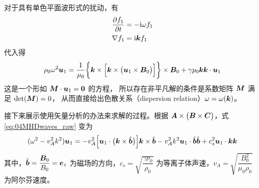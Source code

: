 对于具有单色平面波形式的扰动，有
\begin{subequations}\begin{align}
\frac{\partial {f_1}}{\partial {t}} &= - \mathrm{i} \omega f_1 \\
\nabla {f_1} &= \mathrm{i} \bm{k} f_1
\end{align}\end{subequations}
代入得
\begin{equation} \label{eq:04MHDwaves_raw}
\rho_0 \omega^2 \bm{u}_1
= \frac{1}{\mu_0} \bigg\{ \bm{k} \times \Big[ \bm{k} \times \big( \bm{u}_1 \times \bm{B}_0 \big) \Big] \bigg\} \times \bm{B}_0
+ \gamma p_0 \bm{k} \bm{k} \cdot \bm{u}_1
\end{equation}
这是一个形如 $ \bm{M} \cdot \bm{u}_1 = \bm{0} $ 的方程，
所以存在非平凡解的条件是系数矩阵 $\bm{M}$ 满足 $\det(\bm{M}) = 0$，
从而直接给出色散关系（dispersion relation）$\omega = \omega(\bm{k})$。

接下来展示使用矢量分析的办法来求解的过程。根据 $\bm{A} \times \big(\bm{B} \times \bm{C}\big)$，式 \ref{eq:04MHDwaves_raw} 变为
\begin{equation} \label{eq:04MHDwaves_raw2}
(\omega^2 - v_A^2 k^2) \bm{u}_1
= - v_A^2 \Big[ \bm{u}_1 \cdot \big(\bm{k} \times \hat{\bm{b}} \big) \Big] \bm{k} \times \hat{\bm{b}}
- v_A^2 k^2 \bm{u}_1 \cdot \hat{\bm{b}} \hat{\bm{b}}
+ c_s^2 \bm{u}_1 \cdot \bm{k} \bm{k}
\end{equation}
其中，$\hat{\bm{b}} = \dfrac{\bm{B}_0}{B_0} = \bm{e}_z$ 为磁场的方向，$c_s = \sqrt{\dfrac{\gamma p_0}{\rho_0}}$ 为等离子体声速，$v_A = \sqrt{\dfrac{B_0^2}{\mu_0 \rho_0}}$ 为阿尔芬速度。

